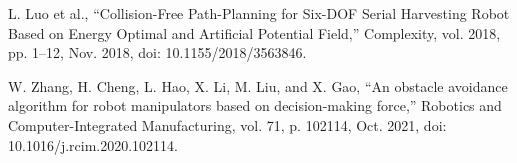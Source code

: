\documentclass[letterpaper, 10 pt, conference]{ieeeconf}  %
\begin{document}
\begin{thebibliography}{99}
 L. Luo et al., “Collision-Free Path-Planning for Six-DOF Serial Harvesting Robot Based on Energy Optimal and Artificial Potential Field,” Complexity, vol. 2018, pp. 1–12, Nov. 2018, doi: 10.1155/2018/3563846.

 W. Zhang, H. Cheng, L. Hao, X. Li, M. Liu, and X. Gao, “An obstacle avoidance algorithm for robot manipulators based on decision-making force,” Robotics and Computer-Integrated Manufacturing, vol. 71, p. 102114, Oct. 2021, doi: 10.1016/j.rcim.2020.102114.



\end{thebibliography}
\end{document}
